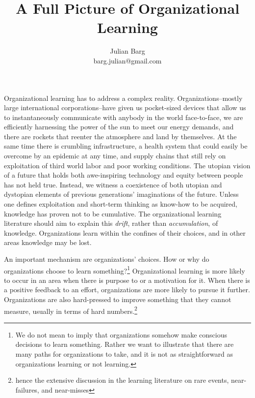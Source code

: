 \documentclass[12pt, man, natbib]{apa6}
\title{A Full Picture of Organizational Learning}
\author{Julian Barg\\barg.julian@gmail.com}
\affiliation{Ivey Business School}
\begin{document}
	
	\maketitle
	
	\singlespacing
	
	\section{}	
	Organizational learning has to address a complex reality. Organizations--mostly large international corporations--have given us pocket-sized devices that allow us to instantaneously communicate with anybody in the world face-to-face, we are efficiently harnessing the power of the sun to meet our energy demands, and there are rockets that reenter the atmosphere and land by themselves. At the same time there is crumbling infrastructure, a health system that could easily be overcome by an epidemic at any time, and supply chains that still rely on exploitation of third world labor and poor working conditions. The utopian vision of a future that holds both awe-inspiring technology and equity between people has not held true. Instead, we witness a coexistence of both utopian and dystopian elements of previous generations' imaginations of the future. Unless one defines exploitation and short-term thinking as know-how to be acquired, knowledge has proven not to be cumulative. The organizational learning literature should aim to explain this \textit{drift}, rather than \textit{accumulation}, of knowledge. Organizations learn within the confines of their choices, and in other areas knowledge may be lost.
	
	An important mechanism are organizations' choices. How or why do organizations choose to learn something?\footnote{We do not mean to imply that organizations somehow make conscious decisions to learn something. Rather we want to illustrate that there are many paths for organizations to take, and it is not as straightforward as organizations learning or not learning.} Organizational learning is more likely to occur in an area when there is purpose to or a motivation for it. When there is a positive feedback to an effort, organizations are more likely to pursue it further. Organizations are also hard-pressed to improve something that they cannot measure, usually in terms of hard numbers.\footnote{hence the extensive discussion in the learning literature on rare events, near-failures, and near-misses}
	
\end{document}
